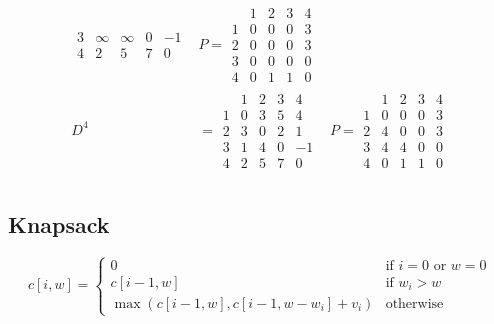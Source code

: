 \documentclass{article}
\begin{document}
\begin{multicols*}{2}
\begin{align*}
\begin{array}{c|cccc}
                    3 & \infty & \infty & 0 & -1 \\
                    4 & 2      & 5      & 7 & 0
                \end{array}
            & P = \begin{array}{c|cccc}
                        & 1 & 2 & 3 & 4 \\
                      \hline
                      1 & 0 & 0 & 0 & 3 \\
                      2 & 0 & 0 & 0 & 3 \\
                      3 & 0 & 0 & 0 & 0 \\
                      4 & 0 & 1 & 1 & 0
                  \end{array}                \\
        D^4 & = \begin{array}{c|cccc}
                      & 1 & 2 & 3 & 4  \\
                    \hline
                    1 & 0 & 3 & 5 & 4  \\
                    2 & 3 & 0 & 2 & 1  \\
                    3 & 1 & 4 & 0 & -1 \\
                    4 & 2 & 5 & 7 & 0
                \end{array}
            & P = \begin{array}{c|cccc}
                        & 1 & 2 & 3 & 4 \\
                      \hline
                      1 & 0 & 0 & 0 & 3 \\
                      2 & 4 & 0 & 0 & 3 \\
                      3 & 4 & 4 & 0 & 0 \\
                      4 & 0 & 1 & 1 & 0
                  \end{array}                \\
    \end{align*}

    \subsection*{Knapsack}
    \begin{equation*}
        c[i, w] = \begin{cases}
            0                                    & \text{if } i = 0 \text{ or } w = 0 \\
            c[i-1, w]                            & \text{if } w_i > w                 \\
            \max(c[i-1, w], c[i-1, w-w_i] + v_i) & \text{otherwise}
        \end{cases}
    \end{equation*}
\end{multicols*}
\end{document}
